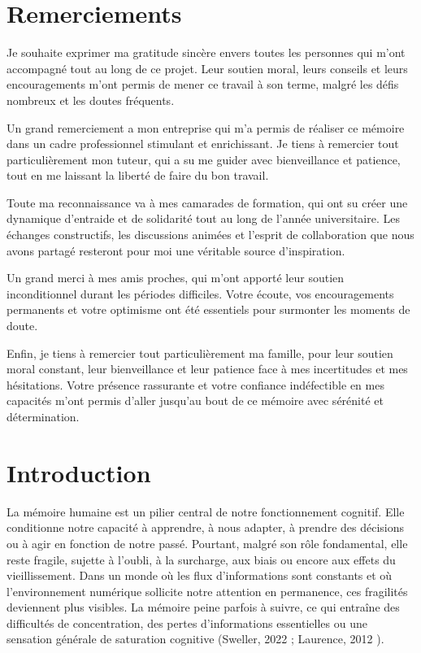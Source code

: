 \documentclass[11pt,a4paper]{report}
\begin{document}
\chapter*{Remerciements}

Je souhaite exprimer ma gratitude sincère envers toutes les personnes qui m’ont accompagné tout au long de ce projet. Leur soutien moral, leurs conseils et leurs encouragements m’ont permis de mener ce travail à son terme, malgré les défis nombreux et les doutes fréquents.

Un grand remerciement a mon entreprise qui m’a permis de réaliser ce mémoire dans un cadre professionnel stimulant et enrichissant. Je tiens à remercier tout particulièrement mon tuteur, qui a su me guider avec bienveillance et patience, tout en me laissant la liberté de faire du bon travail.

Toute ma reconnaissance va à mes camarades de formation, qui ont su créer une dynamique d’entraide et de solidarité tout au long de l'année universitaire. Les échanges constructifs, les discussions animées et l’esprit de collaboration que nous avons partagé resteront pour moi une véritable source d’inspiration.

Un grand merci à mes amis proches, qui m’ont apporté leur soutien inconditionnel durant les périodes difficiles. Votre écoute, vos encouragements permanents et votre optimisme ont été essentiels pour surmonter les moments de doute.

Enfin, je tiens à remercier tout particulièrement ma famille, pour leur soutien moral constant, leur bienveillance et leur patience face à mes incertitudes et mes hésitations. Votre présence rassurante et votre confiance indéfectible en mes capacités m’ont permis d’aller jusqu’au bout de ce mémoire avec sérénité et détermination.

\chapter*{Introduction}

La mémoire humaine est un pilier central de notre fonctionnement cognitif. Elle conditionne notre capacité à apprendre, à nous adapter, à prendre des décisions ou à agir en fonction de notre passé. Pourtant, malgré son rôle fondamental, elle reste fragile, sujette à l’oubli, à la surcharge, aux biais ou encore aux effets du vieillissement. Dans un monde où les flux d’informations sont constants et où l’environnement numérique sollicite notre attention en permanence, ces fragilités deviennent plus visibles. La mémoire peine parfois à suivre, ce qui entraîne des difficultés de concentration, des pertes d’informations essentielles ou une sensation générale de saturation cognitive (Sweller, 2022 \cite{sweller} ; Laurence, 2012 \cite{taconnat}).
\end{document}
